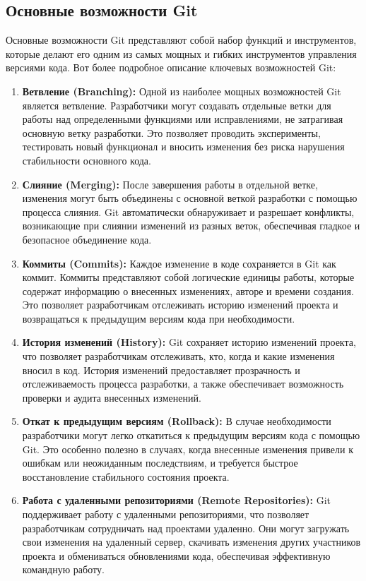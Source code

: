 \subsection{\label{subsec:ch01/sec01/sub03}Основные возможности Git}
Основные возможности Git представляют собой набор функций и инструментов, которые делают его одним из самых мощных и гибких инструментов управления версиями кода. Вот более подробное описание ключевых возможностей Git:
\begin{enumerate}
    \item \textbf{Ветвление (Branching):} Одной из наиболее мощных возможностей Git является ветвление. Разработчики могут создавать отдельные ветки для работы над определенными функциями или исправлениями, не затрагивая основную ветку разработки. Это позволяет проводить эксперименты, тестировать новый функционал и вносить изменения без риска нарушения стабильности основного кода.
    \item \textbf{Слияние (Merging):} После завершения работы в отдельной ветке, изменения могут быть объединены с основной веткой разработки с помощью процесса слияния. Git автоматически обнаруживает и разрешает конфликты, возникающие при слиянии изменений из разных веток, обеспечивая гладкое и безопасное объединение кода.
    \item \textbf{Коммиты (Commits):} Каждое изменение в коде сохраняется в Git как коммит. Коммиты представляют собой логические единицы работы, которые содержат информацию о внесенных изменениях, авторе и времени создания. Это позволяет разработчикам отслеживать историю изменений проекта и возвращаться к предыдущим версиям кода при необходимости.
    \item \textbf{История изменений (History):} Git сохраняет историю изменений проекта, что позволяет разработчикам отслеживать, кто, когда и какие изменения вносил в код. История изменений предоставляет прозрачность и отслеживаемость процесса разработки, а также обеспечивает возможность проверки и аудита внесенных изменений.
    \item \textbf{Откат к предыдущим версиям (Rollback):} В случае необходимости разработчики могут легко откатиться к предыдущим версиям кода с помощью Git. Это особенно полезно в случаях, когда внесенные изменения привели к ошибкам или неожиданным последствиям, и требуется быстрое восстановление стабильного состояния проекта.
    \item \textbf{Работа с удаленными репозиториями (Remote Repositories):} Git поддерживает работу с удаленными репозиториями, что позволяет разработчикам сотрудничать над проектами удаленно. Они могут загружать свои изменения на удаленный сервер, скачивать изменения других участников проекта и обмениваться обновлениями кода, обеспечивая эффективную командную работу.

\end{enumerate}
